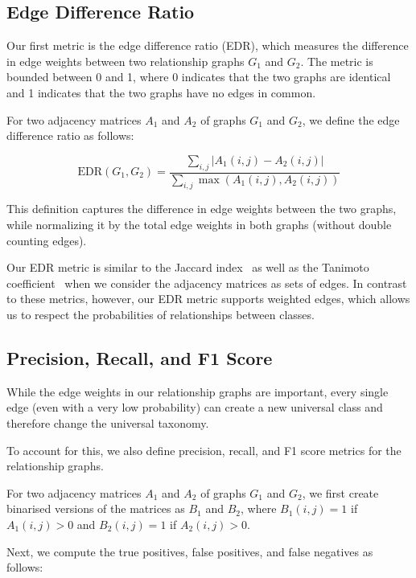 \subsection{Edge Difference Ratio} \label{sec:edr}

Our first metric is the edge difference ratio (EDR),
which measures the difference in edge weights between two relationship graphs $G_1$ and $G_2$.
The metric is bounded between 0 and 1, where 0 indicates that the two graphs are identical
and 1 indicates that the two graphs have no edges in common.

For two adjacency matrices $A_1$ and $A_2$ of graphs $G_1$ and $G_2$,
we define the edge difference ratio as follows:

\begin{equation}
      \text{EDR}(G_1, G_2) = \frac{\sum_{i,j} |A_1(i,j) - A_2(i,j)|}{\sum_{i,j} \max(A_1(i,j), A_2(i,j))}
\end{equation}

This definition captures the difference in edge weights between the two graphs,
while normalizing it by the total edge weights in both graphs (without double counting edges).

Our EDR metric is similar to the Jaccard index~\cite{jaccard_distribution_1912} as well as the Tanimoto coefficient~\cite{tanimoto_elementary_1958}
when we consider the adjacency matrices as sets of edges.
In contrast to these metrics, however, our EDR metric supports weighted edges,
which allows us to respect the probabilities of relationships between classes.

\subsection{Precision, Recall, and F1 Score}

While the edge weights in our relationship graphs are important,
every single edge (even with a very low probability) can create a new universal class
and therefore change the universal taxonomy.

To account for this, we also define precision, recall, and F1 score metrics
for the relationship graphs.

For two adjacency matrices $A_1$ and $A_2$ of graphs $G_1$ and $G_2$,
we first create binarised versions of the matrices as $B_1$ and $B_2$,
where $B_1(i,j) = 1$ if $A_1(i,j) > 0$ and $B_2(i,j) = 1$ if $A_2(i,j) > 0$.

Next, we compute the true positives, false positives, and false negatives as follows:

